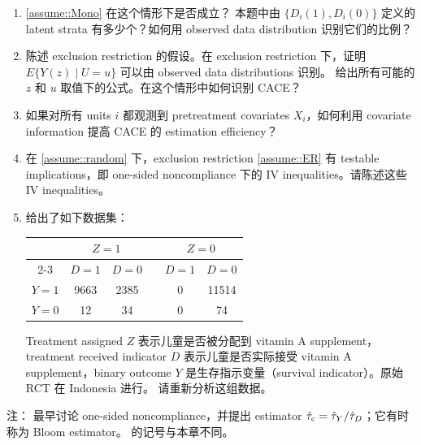  
\begin{enumerate}
[(1)]
\item 
\cref{assume::Mono} 在这个情形下是否成立？
本题中由 $\{ D_i(1), D_i(0)  \}$ 定义的 latent strata 有多少个？如何用 observed data distribution 识别它们的比例？

\item 
陈述 exclusion restriction 的假设。在 exclusion restriction 下，证明 $E\{  Y(z) \mid U = u \}$ 可以由 observed data distributions 识别。
给出所有可能的 $z$ 和 $u$ 取值下的公式。在这个情形中如何识别 CACE？

 

\item
如果对所有 units $i$ 都观测到 pretreatment covariates $X_i$，如何利用 covariate information 提高 CACE 的 estimation efficiency？
 
 
 \item 
 在 \cref{assume::random} 下，exclusion restriction \cref{assume::ER} 有 testable implications，即 one-sided noncompliance 下的 IV inequalities。请陈述这些 IV inequalities。
 
\item
\citet{sommer1991estimating} 给出了如下数据集：
 
 \begin{center}
\begin{tabular}{cccccc} 
\hline 
      &   \multicolumn{2}{c}{$Z=1$}  &  &  \multicolumn{2}{c}{$Z=0$}  \\  \cline{2-3} \cline{5-6} 
      & $D=1$  &  $D=0$           &       &  $D=1$  &  $D=0$\\
 $Y=1$ &   9663    &     2385         &      &     0       &    11514       \\
 $Y=0$ &   12   &     34            &      &     0         &    74           \\  
 \hline 
\end{tabular}
 \end{center}
 
Treatment assigned $Z$ 表示儿童是否被分配到 vitamin A supplement，treatment received indicator $D$ 表示儿童是否实际接受 vitamin A supplement，binary outcome $Y$ 是生存指示变量（survival indicator）。原始 RCT 在 Indonesia 进行。
请重新分析这组数据。
 \end{enumerate}
 
 
注：\citet{bloom1984accounting} 最早讨论 one-sided noncompliance，并提出 estimator $\hat\tau_{\textup{c}} = \hat\tau_Y / \hat\tau_D$；它有时称为 Bloom estimator。\citet{bloom1984accounting} 的记号与本章不同。

